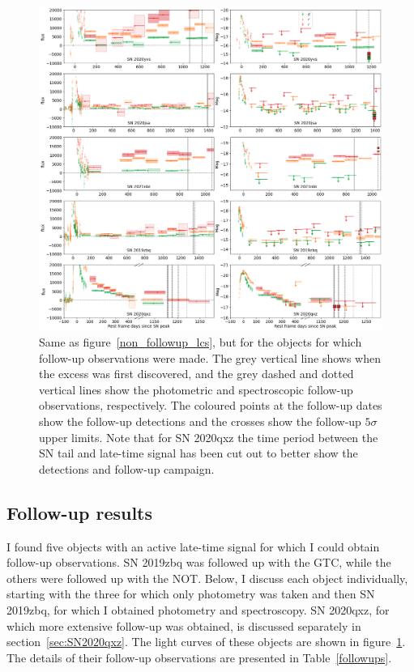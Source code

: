 \documentclass[a4paper,oneside,12pt, class=Latex/Classes/PhDthesisPSnPDF, crop=false]{standalone}
\begin{document}
\begin{figure}[h!]
    \centering
    \includegraphics[width=\textwidth]{../Images/chapter_5/followup_lcs.png}
    \caption[Binned light cuves of the objects that were followed up on.]{Same as figure~\ref{non_followup_lcs}, but for the objects for which follow-up observations were made. The grey vertical line shows when the excess was first discovered, and the grey dashed and dotted vertical lines show the photometric and spectroscopic follow-up observations, respectively. The coloured points at the follow-up dates show the follow-up detections and the crosses show the follow-up $5\sigma$ upper limits. Note that for SN 2020qxz the time period between the SN tail and late-time signal has been cut out to better show the detections and follow-up campaign.}
    \label{followup_lcs}
\end{figure}


\subsection{Follow-up results}
\label{followups_section}
I found five objects with an active late-time signal for which I could obtain follow-up observations. SN 2019zbq was followed up with the GTC, while the others were followed up with the NOT. Below, I discuss each object individually, starting with the three for which only photometry was taken and then SN 2019zbq, for which I obtained photometry and spectroscopy. SN 2020qxz, for which more extensive follow-up was obtained, is discussed separately in section~\ref{sec:SN2020qxz}. The light curves of these objects are shown in figure~\ref{followup_lcs}. The details of their follow-up observations are presented in Table~\ref{followups}.\\
\end{document}
